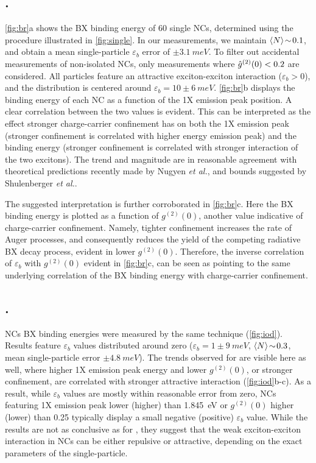\documentclass[journal=nalefd, manuscript=letter, layout=twocolumn]{achemso}
\begin{document}
\subsection*{.}
\autoref{fig:br}a shows the BX binding energy of 60 single  NCs, determined using the procedure illustrated in \autoref{fig:single}. In our measurements, we maintain $\ev{N}\!\sim\!0.1$, and obtain a mean single-particle $\varepsilon_b$ error of $\pm\SI{3.1}{meV}$. To filter out accidental measurements of non-isolated NCs, only measurements where $\Hat{g}^{(2)}(0)<0.2$ are considered. All particles feature an attractive exciton-exciton interaction ($\varepsilon_b>0$), and the distribution is centered around $\varepsilon_b=10\pm\SI{6}{meV}$. \autoref{fig:br}b displays the binding energy of each NC as a function of the 1X emission peak position. A clear correlation between the two values is evident. This can be interpreted as the effect stronger charge-carrier confinement has on both the 1X emission peak (stronger confinement is correlated with higher energy emission peak) and the binding energy (stronger confinement is correlated with stronger interaction of the two excitons). The trend and magnitude are in reasonable agreement with theoretical predictions recently made by Nugyen \textit{et al.}\cite{Nguyen2020}, and bounds suggested by Shulenberger \textit{et al.}\cite{Shulenberger2019}.

The suggested interpretation is further corroborated in \autoref{fig:br}c. Here the BX binding energy is plotted as a function of $g^{(2)}(0)$, another value indicative of charge-carrier confinement. Namely, tighter confinement increases the rate of Auger processes\cite{Melnychuk2021}, and consequently reduces the yield of the competing radiative BX decay process, evident in lower $g^{(2)}(0)$. Therefore, the inverse correlation of $\varepsilon_b$ with $g^{(2)}(0)$ evident in \autoref{fig:br}c, can be seen as pointing to the same underlying correlation of the BX binding energy with charge-carrier confinement.

\subsection*{.}
 NCs BX binding energies were measured by the same technique (\autoref{fig:iod}). Results feature $\varepsilon_b$ values distributed around zero ($\varepsilon_b=1\pm\SI{9}{meV}$, $\ev{N}\!\sim\!0.3$, mean single-particle error $\pm\SI{4.8}{meV}$). The trends observed for  are visible here as well, where higher 1X emission peak energy and lower $g^{(2)}(0)$, or stronger confinement, are correlated with stronger attractive interaction (\autoref{fig:iod}b-c). As a result, while $\varepsilon_b$ values are mostly within reasonable error from zero, NCs featuring 1X emission peak lower (higher) than \SI{1.845}{eV} or $g^{(2)}(0)$ higher (lower) than 0.25 typically display a small negative (positive) $\varepsilon_b$ value. While the results are not as conclusive as for , they suggest that the weak exciton-exciton interaction in  NCs can be either repulsive or attractive, depending on the exact parameters of the single-particle.
\end{document}
